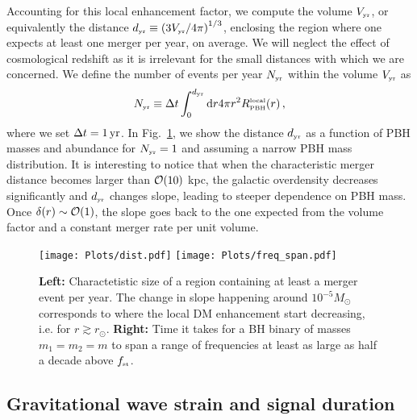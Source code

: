 \documentclass[11pt,a4paper]{article}
\renewcommand{\d}{{\rm d}}
\newcommand{\lp }{\left (}
\newcommand{\rp }{\right )}
\begin{document}
Accounting for this local enhancement factor, we compute the volume $V_\text{\tiny yr}$, 
or equivalently the distance $d_\text{\tiny yr}  \equiv  \lp 3 V_\text{\tiny yr}/ 4 \pi  \rp ^{1/3}$, 
enclosing the region where one expects at least one merger per year, on average. 
We will neglect the effect of cosmological redshift as it is irrelevant for the small distances with which we are concerned.
We define the number of events per year $N_\text{\tiny yr}$ within the volume $V_\text{\tiny yr}$ as 
\begin{equation}
N_\text{\tiny yr} \equiv 
\Delta t \int^{d_\text{\tiny yr}}_0 \d r 4 \pi r^2 R^\text{\tiny local}_\text{\tiny PBH}(r)
\,,
\end{equation}
where we set $\Delta t = 1\,{\rm yr}$.
In Fig.~\ref{fig: dist}, we show the distance $d_\text{\tiny yr}$ as a function of PBH masses and abundance for $N_\text{\tiny yr} = 1$ and assuming a narrow PBH mass distribution. It is interesting to notice that when the characteristic merger distance becomes larger than ${\cal O}(10)$ kpc, the galactic overdensity decreases significantly and $d_\text{\tiny yr}$ changes slope, leading to steeper dependence on PBH mass. Once $\delta(r) \sim {\cal O}(1) $, the slope goes back to the one expected from the volume factor and a constant merger rate per unit volume. 

\begin{figure}[t!]
\centering
\texttt{[image: Plots/dist.pdf]}
\texttt{[image: Plots/freq\_span.pdf]}
\caption{%
{\bf Left: }
Charactetistic size of a region containing at least a merger event per year. 
The change in slope happening around $10^{-5}M_\odot$ corresponds to where the local DM 
enhancement start decreasing, i.e. for $r\gtrsim r_\odot$. 
%
{\bf Right:} Time it takes for a BH binary of masses $m_1 = m_2 = m$ to span a range of frequencies at least as large as half a decade above $f_\text{\tiny st}$.
}\label{fig: dist}
\end{figure}

\subsection{Gravitational wave strain and signal duration}
\label{sec:SignalDuration}
\end{document}
